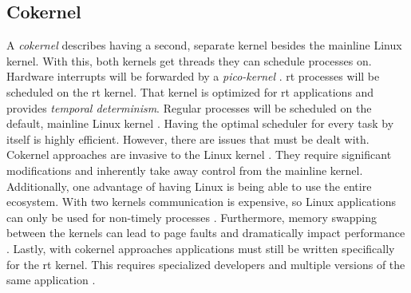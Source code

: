 \documentclass[10pt,twocolumn,a4paper]{article}
\begin{document}
\subsection{Cokernel}
A \emph{cokernel} describes having a second, separate kernel besides the mainline Linux kernel.
With this, both kernels get threads they can schedule processes on.
Hardware interrupts will be forwarded by a \emph{pico-kernel} \cite{reghenzani_realtime_2019}.
\acrshort{rt} processes will be scheduled on the \acrshort{rt} kernel.
That kernel is optimized for \acrshort{rt} applications and provides \emph{temporal determinism}.
Regular processes will be scheduled on the default, mainline Linux kernel \cite{reghenzani_realtime_2019}.
Having the optimal scheduler for every task by itself is highly efficient.
However, there are issues that must be dealt with.
Cokernel approaches are invasive to the Linux kernel \cite{reghenzani_realtime_2019}.
They require significant modifications and inherently take away control from the mainline kernel.
Additionally, one advantage of having Linux is being able to use the entire ecosystem.
With two kernels communication is expensive, so Linux applications can only be used for non-timely processes \cite{reghenzani_realtime_2019}.
Furthermore, memory swapping between the kernels can lead to page faults and dramatically impact performance \cite{reghenzani_realtime_2019}.
Lastly, with cokernel approaches applications must still be written specifically for the \acrshort{rt} kernel.
This requires specialized developers and multiple versions of the same application \cite{reghenzani_realtime_2019}.
\end{document}
